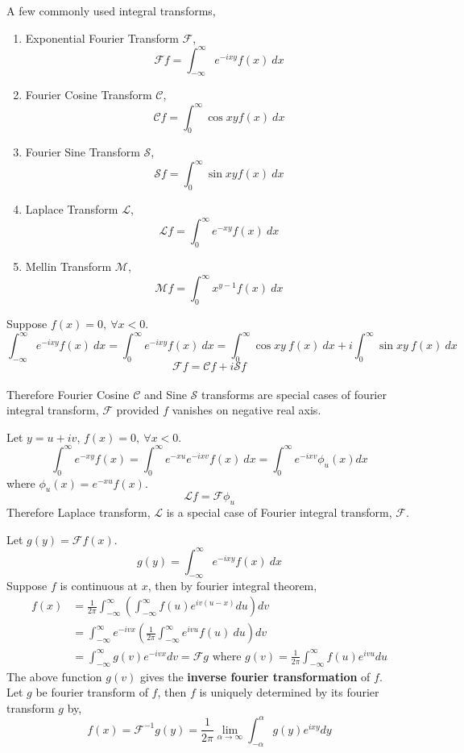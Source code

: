 \begin{remark} A few commonly used integral transforms,
\begin{enumerate}
	\item Exponential Fourier Transform $\mathscr{F}$,
		\[ \mathscr{F}f = \int_{-\infty}^\infty e^{-ixy}f(x)\ dx \]
	\item Fourier Cosine Transform $\mathscr{C}$,
		\[ \mathscr{C}f = \int_0^\infty \cos xy f(x)\ dx \]
	\item Fourier Sine Transform $\mathscr{S}$,
		\[ \mathscr{S}f = \int_0^\infty \sin xy f(x)\ dx \]
	\item Laplace Transform $\mathscr{L}$,
		\[ \mathscr{L}f = \int_0^\infty e^{-xy} f(x)\ dx \]
	\item Mellin Transform $\mathscr{M}$,
		\[ \mathscr{M}f = \int_0^\infty x^{y-1}f(x)\ dx \]
\end{enumerate}
\end{remark}

\begin{remark} Suppose \( f(x) = 0,\ \forall x < 0 \).
	\[ \int_{-\infty}^\infty e^{-ixy}f(x)\ dx = \int_0^\infty e^{-ixy}f(x)\ dx = \int_0^\infty \cos xy \ f(x)\ dx + i \int_0^\infty \sin xy \ f(x)\ dx \]
	\[ \mathscr{F}f = \mathscr{C}f + i\mathscr{S}f \]\\
	Therefore Fourier Cosine $\mathscr{C}$ and Sine $\mathscr{S}$ transforms are special cases of fourier integral transform, $\mathscr{F}$ provided $f$ vanishes on negative real axis.
\end{remark}

\begin{remark} Let \( y = u+iv \), \( f(x) = 0,\ \forall x < 0 \).
	\[ \int_0^\infty e^{-xy}f(x) = \int_0^\infty e^{-xu}e^{-ixv}f(x)\ dx = \int_0^\infty e^{-ixv} \phi_u(x) dx \]
	where \( \phi_u(x) = e^{-xu}f(x) \).
	\[ \mathscr{L}f = \mathscr{F}\phi_u \]
	Therefore Laplace transform, $\mathscr{L}$ is a special case of Fourier integral transform, $\mathscr{F}$.
\end{remark}

\begin{remark} Let \( g(y) = \mathscr{F}f(x) \).
	\[ g(y) = \int_{-\infty}^\infty e^{-ixy}f(x)\ dx \]
	Suppose $f$ is continuous at $x$, then by fourier integral theorem,
	\begin{align*}
		f(x)	& = \frac{1}{2\pi} \int_{-\infty}^\infty \left( \int_{-\infty}^\infty f(u) e^{iv(u-x)} du \right) dv\\
			& = \int_{-\infty}^\infty e^{-ivx} \left( \frac{1}{2\pi} \int_{-\infty}^\infty e^{ivu} f(u)\ du \right) dv\\
			& = \int_{-\infty}^\infty g(v) e^{-ivx} dv = \mathscr{F}g \text{ where } g(v) = \frac{1}{2\pi}\int_{-\infty}^\infty f(u) e^{ivu} du 
	\end{align*}
	The above function $g(v)$ gives the \textbf{inverse fourier transformation} of $f$.\\

	Let $g$ be fourier transform of $f$, then $f$ is uniquely determined by its fourier transform $g$ by,
	\[ f(x) = \mathscr{F}^{-1}g(y) = \frac{1}{2\pi} \lim_{\alpha \to \infty} \int_{-\alpha}^\alpha g(y) e^{ixy} dy \]
\end{remark}

